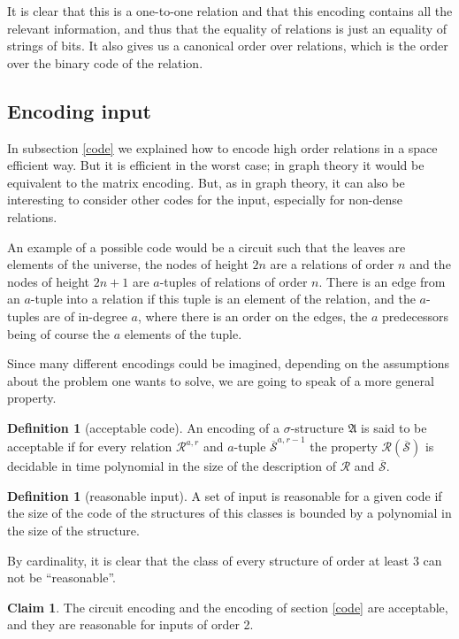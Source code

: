 \documentclass[a4paper,12pt]{article}
\theoremstyle{definition}
\newtheorem{definition}[theorem]{Definition}
\newtheorem{claim}[theorem]{Claim}
\newcommand{\mc}{\mathcal}
\newcommand{\olmc}[1]{\overline{\mathcal{#1}}}
\begin{document}
It is clear that this is a one-to-one relation and that this encoding
contains all the relevant information, and thus that the equality of
relations is just an equality of strings of bits. It also gives us a
canonical order over relations, which is the order over the binary
code of the relation.



\subsection{Encoding input}\label{acc}
In subsection \ref{code} we explained how to encode high order
relations in a space efficient way. But it is efficient in the worst
case; in graph theory it would be equivalent to the matrix encoding.
But, as in graph theory, it can also be interesting to consider other
codes for the input, especially for non-dense relations.

An example of a possible code would be a circuit such that the leaves
are elements of the universe, the nodes of height $2n$ are a relations
of order $n$ and the nodes of height $2n+1$ are $a$-tuples of
relations of order $n$. There is an edge from an $a$-tuple into a
relation if this tuple is an element of the relation, and the
$a$-tuples are of in-degree $a$, where there is an order on the edges,
the $a$ predecessors being of course the $a$ elements of the tuple.

Since many different encodings could be imagined, depending on the
assumptions about the problem one wants to solve, we are going to
speak of a more general property.

\begin{definition}[acceptable code]
  An encoding of a $\sigma$-structure $\mathfrak A$ is said to be
  acceptable if for every relation $\mc R^{a,r}$ and $a$-tuple $\olmc
  S^{a,r-1}$ the property $\mc R(\olmc S)$ is decidable in time
  polynomial in the size of the description of $\mc R$ and $\olmc S$.
\end{definition}


\begin{definition}[reasonable input]\label{reasonable}
  A set of input is reasonable for a given code if the size of the
  code of the structures of this classes is bounded by a polynomial in
  the size of the structure.
\end{definition}
By cardinality, it is clear that the class of every structure of order
at least 3 can not be ``reasonable''.

\begin{claim}
  The circuit encoding and the encoding of section \ref{code} are
  acceptable, and they are reasonable for inputs of order 2.
\end{claim}
\end{document}
